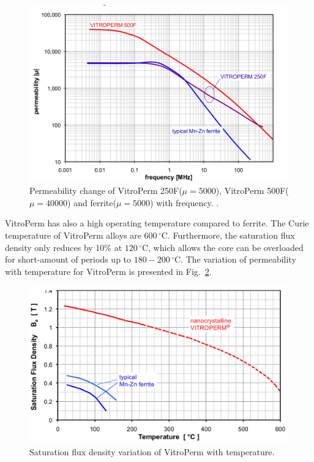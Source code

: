 \documentclass[a4paper, 11pt]{article} %
\begin{document}
\begin{figure}[]
  \centering
    \includegraphics[scale=0.3]{vitroperm500_250_permeability}
  \caption{Permeability change of VitroPerm 250F($\mu = 5000$), VitroPerm 500F($\mu = 40000$) and ferrite($\mu = 5000$) with frequency. \cite{vitroterm_manual}.}
  \label{vitroperm500_250_permeability}
\end{figure}

VitroPerm has also a high operating temperature compared to ferrite. The Curie temperature of VitroPerm alloys are $600\,^{\circ}\mathrm{C}$. Furthermore, the saturation flux density only reduces by 10\% at $120\,^{\circ}\mathrm{C}$, which allows the core can be overloaded for short-amount of periods up to $180-200 \,^{\circ}\mathrm{C}$. The variation of permeability with temperature for VitroPerm is presented in Fig.~\ref{temp_vs_saturation}.

\begin{figure}[]
  \centering
    \includegraphics[scale=0.3]{temp_vs_saturation}
  \caption{Saturation flux density variation of VitroPerm with temperature.}
  \label{temp_vs_saturation}
\end{figure}
\end{document}
